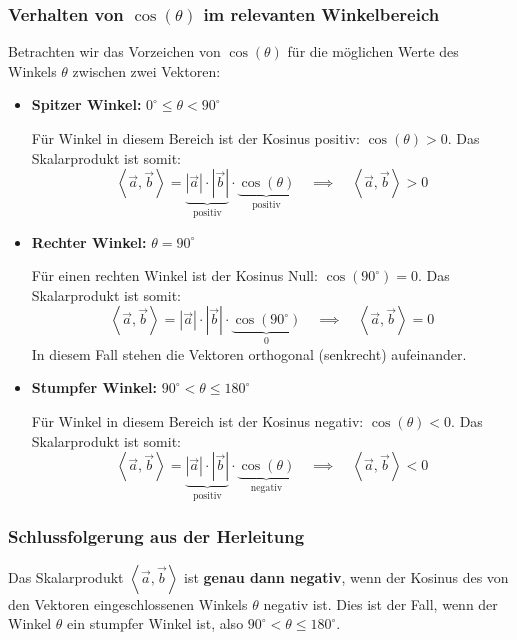 \subsubsection*{Verhalten von $\cos(\theta)$ im relevanten Winkelbereich}
Betrachten wir das Vorzeichen von $\cos(\theta)$ für die möglichen Werte des Winkels $\theta$ zwischen zwei Vektoren:
\begin{itemize}
    \item \textbf{Spitzer Winkel:} $0^\circ \le \theta < 90^\circ$
    
    Für Winkel in diesem Bereich ist der Kosinus positiv: $\cos(\theta) > 0$.
    Das Skalarprodukt ist somit:
    $$ \left\langle \vec{a}, \vec{b} \right\rangle = \underbrace{|\vec{a}| \cdot |\vec{b}|}_{\text{positiv}} 
    \cdot \underbrace{\cos(\theta)}_{\text{positiv}} \quad \implies \quad \left\langle \vec{a}, \vec{b} 
    \right\rangle > 0 $$
    
    \item \textbf{Rechter Winkel:} $\theta = 90^\circ$
    
    Für einen rechten Winkel ist der Kosinus Null: $\cos(90^\circ) = 0$.
    Das Skalarprodukt ist somit:
    $$ \left\langle \vec{a}, \vec{b} \right\rangle = |\vec{a}| \cdot |\vec{b}| \cdot 
    \underbrace{\cos(90^\circ)}_{0} \quad \implies \quad \left\langle \vec{a}, \vec{b} \right\rangle = 0 $$
    In diesem Fall stehen die Vektoren orthogonal (senkrecht) aufeinander.
    
    \item \textbf{Stumpfer Winkel:} $90^\circ < \theta \le 180^\circ$
    
    Für Winkel in diesem Bereich ist der Kosinus negativ: $\cos(\theta) < 0$.
    Das Skalarprodukt ist somit:
    $$ \left\langle \vec{a}, \vec{b} \right\rangle = \underbrace{|\vec{a}| \cdot |\vec{b}|}_{\text{positiv}} 
    \cdot \underbrace{\cos(\theta)}_{\text{negativ}} \quad \implies \quad \left\langle \vec{a}, \vec{b} 
    \right\rangle < 0 $$
\end{itemize}

\subsubsection*{Schlussfolgerung aus der Herleitung}
Das Skalarprodukt $\left\langle \vec{a}, \vec{b} \right\rangle$ ist \textbf{genau dann negativ}, wenn der 
Kosinus des von den Vektoren eingeschlossenen Winkels $\theta$ negativ ist. Dies ist der Fall, wenn der 
Winkel $\theta$ ein stumpfer Winkel ist, also $90^\circ < \theta \le 180^\circ$.

